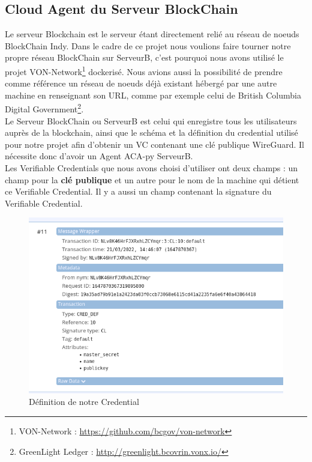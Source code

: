 \documentclass[12pt, openany]{report}
\begin{document}
\subsection{Cloud Agent du Serveur BlockChain}
\noindent 
\begin{flushleft}
Le serveur Blockchain est le serveur étant directement relié au réseau de noeuds BlockChain Indy. Dans le cadre de ce projet nous voulions faire tourner notre propre réseau BlockChain sur ServeurB, c'est pourquoi nous avons utilisé le projet VON-Network\footnote{VON-Network : \url{https://github.com/bcgov/von-network}} dockerisé. Nous avions aussi la possibilité de prendre comme référence un réseau de noeuds déjà existant hébergé par une autre machine en renseignant son URL, comme par exemple celui de British Columbia Digital Government\footnote{GreenLight Ledger : \url{http://greenlight.bcovrin.vonx.io/}}.\\
Le Serveur BlockChain ou ServeurB est celui qui enregistre tous les utilisateurs auprès de la blockchain, ainsi que le schéma et la définition du credential utilisé pour notre projet afin d'obtenir un VC contenant une clé publique WireGuard. Il nécessite donc d'avoir un Agent ACA-py ServeurB.\\
Les Verifiable Credentials que nous avons choisi d'utiliser ont deux champs : un champ pour la \textbf{clé publique} et un autre pour le nom de la machine qui détient ce Verifiable Credential. Il y a aussi un champ contenant la signature du Verifiable Credential.

\begin{figure}[H]
	\includegraphics[scale=0.5]{cred_def.png}
	\centering
	\caption{Définition de notre Credential}
\end{figure}


\end{flushleft}
\end{document}
